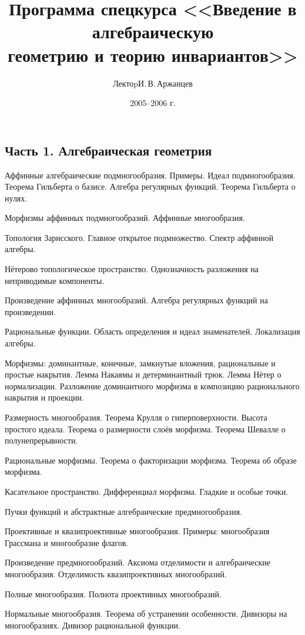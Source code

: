 \documentclass[a4paper]{article}
\title{Программа спецкурса <<Введение в алгебраическую\\геометрию и теорию инвариантов>>}
\author{Лектоp\т И.\,В.\,Аржанцев}
\date{2005--2006 г.}
\begin{document}
\maketitle

\subsection*{Часть 1. Алгебраическая геометрия}

\begin{nums}{0}
\item Аффинные алгебраические подмногообразия. Примеры. Идеал подмногообразия.
      Теорема Гильберта о базисе. Алгебра регулярных функций. Теорема Гильберта о нулях.
\item Морфизмы аффинных подмногообразий. Аффинные многообразия.
\item Топология Зарисского. Главное открытое подмножество. Спектр аффинной алгебры.
\item Нётерово топологическое пространство. Однозначность разложения на неприводимые компоненты.
\item Произведение аффинных многообразий. Алгебра регулярных функций на произведении.
\item Рациональные функции. Область определения и идеал знаменателей. Локализация алгебры.
\item Морфизмы: доминантные, конечные, замкнутые вложения, рациональные и простые накрытия.
      Лемма Накаямы и детерминантный трюк. Лемма Нётер о нормализации.
      Разложение доминантного морфизма в композицию рационального накрытия и проекции.
\item Размерность многообразия. Теорема Крулля о гиперповерхности. Высота простого идеала.
      Теорема о размерности слоёв морфизма. Теорема Шевалле о полунепрерывности.
\item Рациональные морфизмы. Теорема о факторизации морфизма. Теорема об образе морфизма.
\item Касательное пространство. Дифференциал морфизма. Гладкие и особые точки.
\item Пучки функций и абстрактные алгебраические предмногообразия.
\item Проективные и квазипроективные многообразия. Примеры: многообразия Грассмана и многообразие флагов.
\item Произведение предмногообразий. Аксиома отделимости и алгебраические многообразия.
      Отделимость квазипроективных многообразий.
\item Полные многообразия. Полнота проективных многообразий.
\item Нормальные многообразия. Теорема об устранении особенности. Дивизоры на многообразиях.
      Дивизор рациональной функции.
\end{nums}
\end{document}
